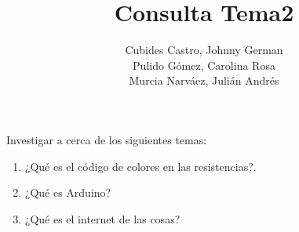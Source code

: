\documentclass{article}
\title{Consulta Tema2}
\author{Cubides Castro, Johnny German \\
        Pulido Gómez, Carolina Rosa\\Murcia Narváez, Julián Andrés}
\begin{document}
\maketitle

Investigar a cerca de los siguientes temas:
\begin{enumerate}
\item ¿Qué es el código de colores en las resistencias?.
\item ¿Qué es Arduino?
\item ¿Qué es el internet de las cosas?
\end{enumerate}
\end{document}
